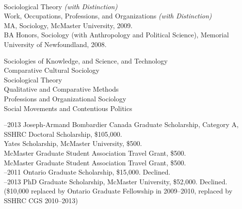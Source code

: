 \documentclass[11pt,usenames,dvipsnames]{article}
\begin{document}
\\
Sociological Theory {\it (with Distinction)}\\
Work, Occupations, Professions, and Organizations {\it (with Distinction)}\\

\noindent MA, Sociology, McMaster University, 2009.\\

\noindent BA Honors, Sociology (with Anthropology and Political Science), Memorial University of Newfoundland, 2008.\\



\noindent Sociologies of Knowledge, and Science, and Technology \\
Comparative Cultural Sociology \\
Sociological Theory\\
Qualitative and Comparative Methods\\ 
Professions and Organizational Sociology\\ 
Social Movements and Contentious Politics\\




–2013 Joseph-Armand Bombardier Canada Graduate Scholarship, Category A, SSHRC Doctoral Scholarship, \$105,000.\\

 Yates Scholarship, McMaster University, \$500.\\

 McMaster Graduate Student Association Travel Grant, \$500.\\

 McMaster Graduate Student Association Travel Grant, \$500.\\

–2011 Ontario Graduate Scholarship, \$15,000. Declined.\\

–2013 PhD Graduate Scholarship, McMaster University, \$52,000. Declined. (\$10,000 replaced by Ontario Graduate Fellowship in 2009–2010, replaced by SSHRC CGS 2010–2013)\\
\end{document}
